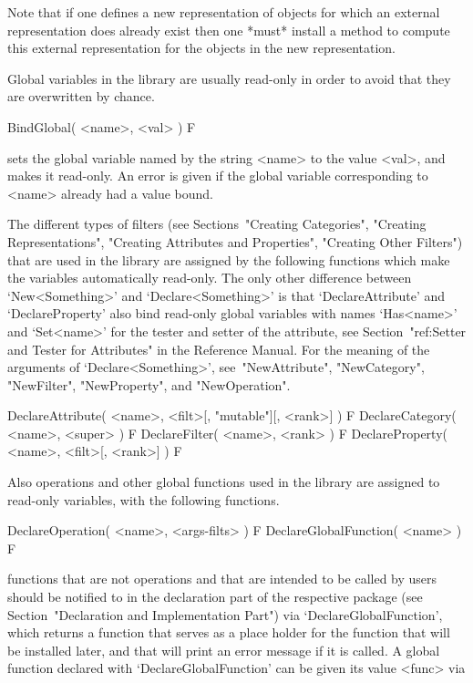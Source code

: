 Note that if one defines a new representation of objects for which an
external representation does already exist
then one *must* install a method to compute this external representation
for the objects in the new representation.



Global variables in the {\GAP} library are usually read-only in order to
avoid that they are overwritten by chance.

\>BindGlobal( <name>, <val> ) F

sets the global variable named by the string <name> to the value <val>,
and makes it read-only.
An error is given if the global variable corresponding to <name>
already had a value bound.

The different types of filters (see Sections~"Creating Categories",
"Creating Representations", "Creating Attributes and Properties",
"Creating Other Filters") that are used in the {\GAP} library are
assigned by the following functions which make the variables automatically
read-only.
The only other difference between `New<Something>' and
`Declare<Something>' is that `DeclareAttribute' and `DeclareProperty'
also bind read-only global variables with names `Has<name>' and `Set<name>'
for the tester and setter of the attribute,
see Section~"ref:Setter and Tester for Attributes" in the Reference Manual.
For the meaning of the arguments of `Declare<Something>',
see~"NewAttribute", "NewCategory", "NewFilter", "NewProperty",
and "NewOperation".

\>DeclareAttribute( <name>, <filt>[, "mutable"][, <rank>] ) F
\>DeclareCategory( <name>, <super> ) F
\>DeclareFilter( <name>, <rank> ) F
\>DeclareProperty( <name>, <filt>[, <rank>] ) F

Also operations and other global functions used in the {\GAP} library
are assigned to read-only variables, with the following functions.

\>DeclareOperation( <name>, <args-filts> ) F
\>DeclareGlobalFunction( <name> ) F

{\GAP} functions that are not operations and that are intended to be
called by users should be notified to {\GAP} in the declaration part
of the respective package
(see Section~"Declaration and Implementation Part")
via `DeclareGlobalFunction', which returns a function that serves as a
place holder for the function that will be installed later,
and that will print an error message if it is called.
A global function declared with `DeclareGlobalFunction' can be given its
value <func> via

